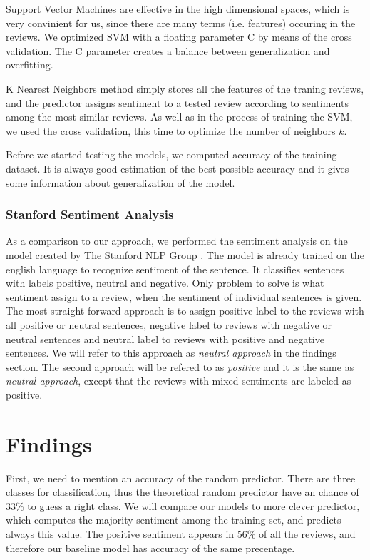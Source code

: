 \documentclass{sig-alternate}
\begin{document}
Support Vector Machines are effective in the high dimensional spaces, which is very convinient for us, since there are many terms (i.e. features) occuring in the reviews.
We optimized SVM with a floating parameter C by means of the cross validation.
The C parameter creates a balance between generalization and overfitting.

K Nearest Neighbors method simply stores all the features of the traning reviews, and the predictor assigns sentiment to a tested review  according to sentiments among the most similar reviews.
As well as in the process of training the SVM, we used the cross validation, this time to optimize the number of neighbors $k$.

Before we started testing the models, we computed accuracy of the training dataset.
It is always good estimation of the best possible accuracy and it gives some information about generalization of the model.

\subsubsection{Stanford Sentiment Analysis}
As a comparison to our approach, we performed the sentiment analysis on the model created by The Stanford NLP Group \cite{stanfnlp}.
The model is already trained on the english language to recognize sentiment of the sentence.
It classifies sentences with labels positive, neutral and negative.
Only problem to solve is what sentiment assign to a review, when the sentiment of individual sentences is given.
The most straight forward approach is to assign positive label to the reviews with all positive or neutral sentences, negative label to reviews with negative or neutral sentences and neutral label to reviews with positive and negative sentences.
We will refer to this approach as {\it neutral approach} in the findings section.
The second approach will be refered to as {\it positive} and it is the same as {\it neutral approach}, except that the reviews with mixed sentiments are labeled as positive.

\section{Findings}
First, we need to mention an accuracy of the random predictor.
There are three classes for classification, thus the theoretical random predictor have an chance of 33\% to guess a right class.
We will compare our models to more clever predictor, which computes the majority sentiment among the training set, and predicts always this value.
The positive sentiment appears in 56\% of all the reviews, and therefore our baseline model has accuracy of the same precentage.
\end{document}
